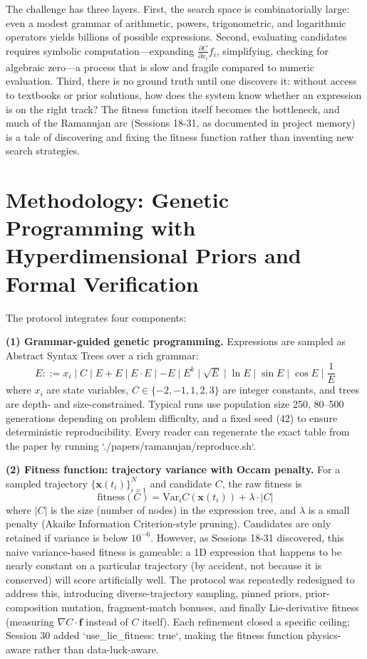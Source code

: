 The challenge has three layers. First, the search space is combinatorially large: even a modest grammar of arithmetic, powers, trigonometric, and logarithmic operators yields billions of possible expressions. Second, evaluating candidates requires symbolic computation---expanding $\frac{\partial C}{\partial x_i} f_i$, simplifying, checking for algebraic zero---a process that is slow and fragile compared to numeric evaluation. Third, there is no ground truth until one discovers it: without access to textbooks or prior solutions, how does the system know whether an expression is on the right track? The fitness function itself becomes the bottleneck, and much of the Ramanujan arc (Sessions 18-31, as documented in project memory) is a tale of discovering and fixing the fitness function rather than inventing new search strategies.

\section{Methodology: Genetic Programming with Hyperdimensional Priors and Formal Verification}

The protocol integrates four components:

\textbf{(1) Grammar-guided genetic programming.} Expressions are sampled as Abstract Syntax Trees over a rich grammar:
\begin{equation}
E ::= x_i \mid C \mid E + E \mid E \cdot E \mid -E \mid E^k \mid \sqrt{E} \mid \ln E \mid \sin E \mid \cos E \mid \frac{1}{E}
\end{equation}
where $x_i$ are state variables, $C \in \{-2, -1, 1, 2, 3\}$ are integer constants, and trees are depth- and size-constrained. Typical runs use population size 250, 80--500 generations depending on problem difficulty, and a fixed seed (42) to ensure deterministic reproducibility. Every reader can regenerate the exact table from the paper by running `./papers/ramanujan/reproduce.sh`.

\textbf{(2) Fitness function: trajectory variance with Occam penalty.} For a sampled trajectory $\{\mathbf{x}(t_i)\}_{i=1}^N$ and candidate $C$, the raw fitness is
\begin{equation}
\text{fitness}(C) = \text{Var}_i C(\mathbf{x}(t_i)) + \lambda \cdot |C|
\end{equation}
where $|C|$ is the size (number of nodes) in the expression tree, and $\lambda$ is a small penalty (Akaike Information Criterion-style pruning). Candidates are only retained if variance is below $10^{-6}$. However, as Sessions 18-31 discovered, this naive variance-based fitness is gameable: a 1D expression that happens to be nearly constant on a particular trajectory (by accident, not because it is conserved) will score artificially well. The protocol was repeatedly redesigned to address this, introducing diverse-trajectory sampling, pinned priors, prior-composition mutation, fragment-match bonuses, and finally Lie-derivative fitness (measuring $\nabla C \cdot \mathbf{f}$ instead of $C$ itself). Each refinement closed a specific ceiling; Session 30 added `use_lie_fitness: true`, making the fitness function physics-aware rather than data-luck-aware.

